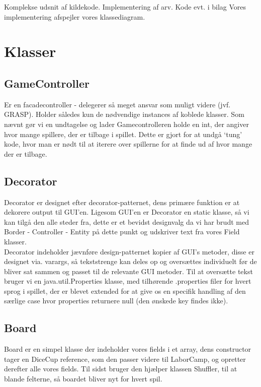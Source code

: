 Komplekse udsnit af kildekode. Implementering af arv. Kode evt. i bilag
Vores implementering afspejler vores klassediagram.
\section*{Klasser}

\subsection*{GameController}
Er en facadecontroller - delegerer så meget ansvar som muligt videre (jvf.
GRASP). Holder således kun de nødvendige instances af koblede klasser. Som nævnt
gør vi en undtagelse og lader Gamecontrolleren holde en int, der angiver hvor
mange spillere, der er tilbage i spillet. Dette er gjort for at undgå ‘tung’
kode, hvor man er nødt til at iterere over spillerne for at finde ud af hvor
mange der er tilbage.
\subsection*{Decorator}
Decorator er designet efter decorator-patternet, dens primære funktion er at
dekorere output til GUI’en. Ligesom GUI’en er Decorator en static klasse, så vi
kan tilgå den alle steder fra, dette er et bevidst designvalg da vi har brudt
med Border - Controller - Entity på dette punkt og udskriver text fra vores
Field klasser.\\
\indent Decorator indeholder jævnføre design-patternet kopier af GUI’s metoder,
disse er designet via. varargs, så tekststrenge kan deles op og oversættes
individuelt før de bliver sat sammen og passet til de relevante GUI metoder. Til
at oversætte tekst bruger vi en java.util.Properties klasse, med tilhørende
.properties filer for hvert sprog i spillet, der er blevet extended for at give
os en specifik handling af den særlige case hvor properties returnere null (den
ønskede key findes ikke).
\subsection*{Board}
Board er en simpel klasse der indeholder vores fields i et array, dens
constructor tager en DiceCup reference, som den passer videre til LaborCamp, og
opretter derefter alle vores fields. Til sidst bruger den hjælper klassen
Shuffler, til at blande felterne, så boardet bliver nyt for hvert spil.
